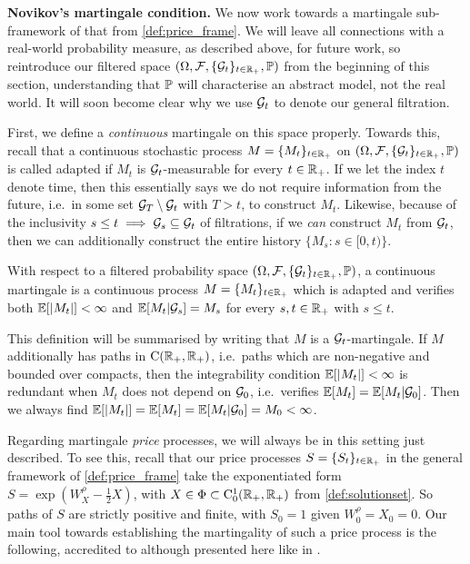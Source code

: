 \vspace{3mm}\textbf{Novikov's martingale condition.} We now work towards a martingale sub-framework of that from \autoref{def:price_frame}. We will leave all connections with a real-world probability measure, as described above, for future work, so reintroduce our filtered space $(\Omega,\mathcal{F},\{\mathcal{G}_t\}_{t\in\mathbb{R}_+},\mathbb{P})$ from the beginning of this section, understanding that $\mathbb{P}$ will characterise an abstract model, not the real world. It will soon become clear why we use $\mathcal{G}_t$ to denote our general filtration.

First, we define a \emph{continuous} martingale on this space properly. Towards this, recall that a continuous stochastic process $M=\{M_t\}_{t\in\mathbb{R}_+}$ on $(\Omega,\mathcal{F},\{\mathcal{G}_t\}_{t\in\mathbb{R}_+},\mathbb{P})$ is called adapted if $M_t$ is $\mathcal{G}_t$-measurable for every $t\in\mathbb{R}_+$. If we let the index $t$ denote time, then this essentially says we do not require information from the future, i.e.~in some set $\mathcal{G}_T\setminus\mathcal{G}_t$ with $T>t$, to construct $M_t$. Likewise, because of the inclusivity $s\le t\implies\mathcal{G}_s\subseteq\mathcal{G}_t$ of filtrations, if we \emph{can} construct $M_t$ from $\mathcal{G}_t$, then we can additionally construct the entire history $\{M_s:s\in[0,t)\}$.

\begin{definition}\label{def:martingale}
    With respect to a filtered probability space $(\Omega,\mathcal{F},\{\mathcal{G}_t\}_{t\in\mathbb{R}_+},\mathbb{P})$, a continuous martingale is a continuous process $M=\{M_t\}_{t\in\mathbb{R}_+}$ which is adapted and verifies both $\mathbb{E}[|M_t|]<\infty$ and $\mathbb{E}[M_t|\mathcal{G}_s]=M_s$ for every $s,t\in\mathbb{R}_+$ with $s\le t$.
\end{definition}

This definition will be summarised by writing that $M$ is a $\mathcal{G}_t$-martingale. If $M$ additionally has paths in $\mathrm{C}(\mathbb{R}_+,\mathbb{R}_+)$, i.e.~paths which are non-negative and bounded over compacts, then the integrability condition $\mathbb{E}[|M_t|]<\infty$ is redundant when $M_t$ does not depend on $\mathcal{G}_0$, i.e.~verifies $\mathbb{E}[M_t] = \mathbb{E}[M_t|\mathcal{G}_0]$. Then we always find $\mathbb{E}[|M_t|]=\mathbb{E}[M_t] = \mathbb{E}[M_t|\mathcal{G}_0]=M_0<\infty$.

Regarding martingale \emph{price} processes, we will always be in this setting just described. To see this, recall that our price processes $S=\{S_t\}_{t\in\mathbb{R}_+}$ in the general framework of \autoref{def:price_frame} take the exponentiated form $S=\exp(W^\rho_X-\frac12 X)$, with $X\in\Phi\subset\mathrm{C}^1_0(\mathbb{R}_+,\mathbb{R}_+)$ from \autoref{def:solutionset}. So paths of $S$ are strictly positive and finite, with $S_0=1$ given $W^\rho_0=X_0=0$. Our main tool towards establishing the martingality of such a price process is the following, accredited to \cite{novikov_1973} although presented here like in \cite{ikeda_1989}.

